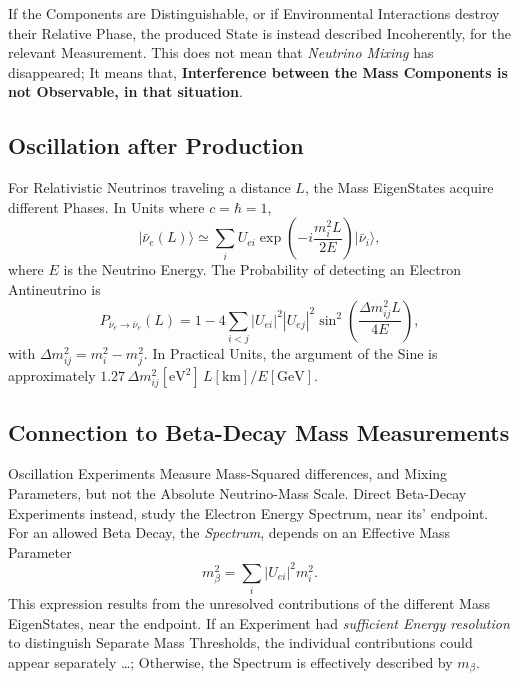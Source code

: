 \documentclass[a4paper, 10pt, onepage]{elegantbook}
\begin{document}
{If the Components are Distinguishable, or if Environmental Interactions destroy their Relative Phase, the produced 
State is instead described Incoherently, for the relevant Measurement. This does not mean that \emph{Neutrino Mixing} 
has disappeared; It means that, \textbf{Interference between the
Mass Components is not Observable, in that situation}.  

\subsection{Oscillation after Production}  

\noindent

For Relativistic Neutrinos traveling a distance $L$, the Mass EigenStates acquire different Phases. In Units where 
$c=\hbar=1$, 
\begin{equation}
  \lvert \bar{\nu}_e(L)\rangle
  \simeq \sum_i U_{ei}
  \exp\!\left(-i\frac{m_i^2L}{2E}\right)
  \lvert \bar{\nu}_i\rangle,
\end{equation}
where $E$ is the Neutrino Energy. The Probability of detecting an Electron Antineutrino is
\begin{equation}
  P_{\bar{\nu}_e\to\bar{\nu}_e}(L)
  = 1 - 4\sum_{i<j}|U_{ei}|^2|U_{ej}|^2
  \sin^2\!\left(\frac{\Delta m_{ij}^2 L}{4E}\right),
\end{equation}
with $\Delta m_{ij}^2=m_i^2-m_j^2$. In Practical Units, the argument of
the Sine is approximately $1.27\,\Delta m_{ij}^2[\mathrm{eV}^2]\,L[\mathrm{km}]/E[\mathrm{GeV}]$.  

\subsection{Connection to Beta-Decay Mass Measurements}  

Oscillation Experiments Measure Mass-Squared differences, and Mixing Parameters, but not the Absolute Neutrino-Mass 
Scale. Direct Beta-Decay Experiments instead, study the Electron Energy Spectrum, near its' endpoint. For an allowed 
Beta Decay, the \emph{Spectrum}, depends on an Effective Mass Parameter
\begin{equation}
  m_\beta^2 = \sum_i |U_{ei}|^2 m_i^2.
\end{equation}
This expression results from the unresolved contributions of the different Mass EigenStates, near the endpoint. If an 
Experiment had \emph{sufficient Energy resolution} to distinguish Separate Mass Thresholds, the individual 
contributions could appear separately \ldots; Otherwise, the Spectrum is effectively described by $m_\beta$.  

}
\end{document}
